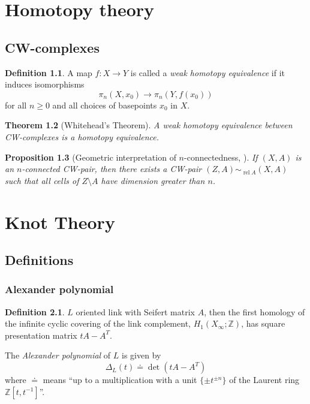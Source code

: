\documentclass[a4paper]{book}
\newtheorem{theorem}{Theorem}[section]
\newtheorem{proposition}[theorem]{Proposition}
\theoremstyle{definition}
\newtheorem{definition}[theorem]{Definition}
\theoremstyle{remark}
\theoremstyle{example}
\DeclareMathOperator{\rel}{rel}
\newcommand{\Z}{\mathbb{Z}}
\begin{document}
\chapter{Homotopy theory}

\section{CW-complexes}

\begin{definition}
	A map $f \colon X \rightarrow Y$ is called a
	\textit{weak homotopy equivalence} 
	if it induces isomorphisms
	\[
		\pi_n(X, x_0) \rightarrow \pi_n(Y, f(x_0))
	\]
	for all $n \ge 0$ and all choices of basepoints $x_0$ in $X$.
\end{definition}

\begin{theorem}[Whitehead's Theorem]
	A weak homotopy equivalence between CW-complexes is a homotopy equivalence.
\end{theorem}

\begin{proposition}[Geometric interpretation of $n$-connectedness, {\cite[Proposition 4.15]{hatcher2002algebraic}}]
	If $(X, A)$ is an $n$-connected CW-pair, then there exists
	a CW-pair $(Z, A) \sim_{\rel A} (X, A)$
	such that all cells of $Z \setminus A$ have dimension greater than $n$.
\end{proposition}


\chapter{Knot Theory}

\section{Definitions}

\subsection{Alexander polynomial}

\begin{definition}
	$L$ oriented link with Seifert matrix $A$, then the first homology of
	the infinite cyclic covering of the link complement, $H_1(X_{\infty} ; \Z)$,
	has square presentation matrix $t A - A^{T}$.
	
	The \textit{Alexander polynomial} of $L$ is given by
	\begin{equation*}
		\Delta_{L}(t) \doteq \det(t A - A^{T})
	\end{equation*}
	where $\doteq$ means ``up to a multiplication with a unit $\{ \pm t^{\pm n} \}$
	of the Laurent ring $\Z[t, t^{-1}]$''.
\end{definition}
\end{document}
